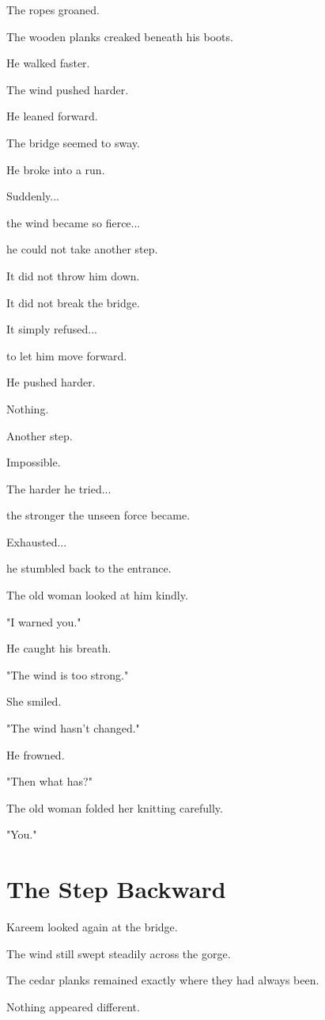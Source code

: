 \documentclass[12pt,openany]{book}
\begin{document}
The ropes groaned.

The wooden planks creaked beneath his boots.

He walked faster.

The wind pushed harder.

He leaned forward.

The bridge seemed to sway.

He broke into a run.

Suddenly...

the wind became so fierce...

he could not take another step.

It did not throw him down.

It did not break the bridge.

It simply refused...

to let him move forward.

He pushed harder.

Nothing.

Another step.

Impossible.

The harder he tried...

the stronger the unseen force became.

Exhausted...

he stumbled back to the entrance.

The old woman looked at him kindly.

"I warned you."

He caught his breath.

"The wind is too strong."

She smiled.

"The wind hasn't changed."

He frowned.

"Then what has?"

The old woman folded her knitting carefully.

"You."

\section*{The Step Backward}

Kareem looked again at the bridge.

The wind still swept steadily across the gorge.

The cedar planks remained exactly where they had always been.

Nothing appeared different.
\end{document}
